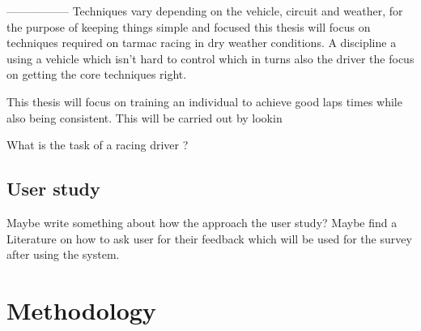 \documentclass{article}
\begin{document}
-----------------
Techniques vary depending on the vehicle, circuit and weather, for the purpose of keeping things simple and focused this thesis will focus on techniques required on tarmac racing in dry weather conditions. A discipline a using a vehicle which isn't hard to control which in turns also the driver the focus on getting the core techniques right.

This thesis will focus on training an individual to achieve good laps times while also being consistent. This will be carried out by lookin

What is the task of a racing driver ?


\subsection{User study}
Maybe write something about how the approach the user study? Maybe find a Literature on how to ask user for their feedback which will be used for the survey after using the system.

\newpage
\section{Methodology}

\newpage
{}

\end{document}
